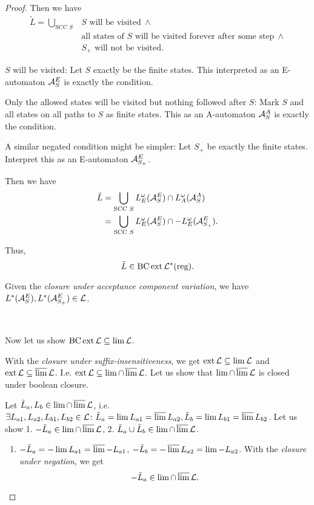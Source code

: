 \begin{lemma}
\begin{proof}
Then we have
\begin{align*}
\tilde L = \bigcup_{\text{SCC } S} & S \text{ will be visited} \ \wedge \\
& \text{all states of } S \text{ will be visited forever after some step} \ \wedge \\
& S_+ \text{ will not be visited} .
\end{align*}

$S$ will be visited: Let $S$ exactly be the finite states. This interpreted as an E-automaton $\mathcal{A}^E_S$ is exactly the condition.

Only the allowed states will be visited but nothing followed after $S$: Mark $S$ and all states on all paths to $S$ as finite states. This as an A-automaton $\mathcal{A}^A_S$ is exactly the condition.

A similar negated condition might be simpler: Let $S_+$ be exactly the finite states. Interpret this as an E-automaton $\mathcal{A}^E_{S_+}$.

Then we have
\begin{align*}
\tilde L & = \bigcup_{\text{SCC } S} L^\omega_E (\mathcal{A}^E_S) \cap L^\omega_A (\mathcal{A}^A_S) \\
& = \bigcup_{\text{SCC } S} L^\omega_E (\mathcal{A}^E_S) \cap -L^\omega_E (\mathcal{A}^E_{S_+}) .
\end{align*}

Thus,
\[ \tilde L \in \operatorname{BC} \operatorname{ext} \mathcal{L}^*(\text{reg}) . \]

Given the \emph{closure under acceptance component variation}, we have $L^*(\mathcal{A}^E_S), L^*(\mathcal{A}^E_{S_+}) \in \mathcal{L}$.

\

Now let us show $\operatorname{BC} \operatorname{ext} \mathcal{L} \subseteq \lim \mathcal{L}$.

With the \emph{closure under suffix-insensitiveness}, we get $\operatorname{ext} \mathcal{L} \subseteq \lim \mathcal{L}$ and $\operatorname{ext} \mathcal{L} \subseteq \operatorname{\overline{lim}} \mathcal{L}$. I.e. $\operatorname{ext} \mathcal{L} \subseteq \lim \cap \operatorname{\overline{lim}} \mathcal{L}$. Let us show that $\lim \cap \operatorname{\overline{lim}} \mathcal{L}$ is closed under boolean closure.

Let $\tilde L_a,L_b \in \lim \cap \operatorname{\overline{lim}} \mathcal{L}$, i.e. $\exists L_{a1}, L_{a2}, L_{b1}, L_{b2} \in \mathcal{L} \colon \tilde L_a = \lim L_{a1} = \operatorname{\overline{lim}} L_{a2}, \tilde L_b = \lim L_{b1} = \operatorname{\overline{lim}} L_{b2}$. Let us show 1. $-\tilde L_a \in \lim \cap \operatorname{\overline{lim}} \mathcal{L}$, 2. $\tilde L_a \cup \tilde L_b \in \lim \cap \operatorname{\overline{lim}} \mathcal{L}$.
\begin{enumerate}
\item $-\tilde L_a = -\lim L_{a1} = \operatorname{\overline{lim}} -L_{a1}$, $-\tilde L_b = -\operatorname{\overline{lim}} L_{a2} = \lim -L_{a2}$. With the \emph{closure under negation}, we get
\[ -\tilde L_a \in \lim \cap \operatorname{\overline{lim}} \mathcal{L} . \]


\end{enumerate}
\end{proof}
\end{lemma}
